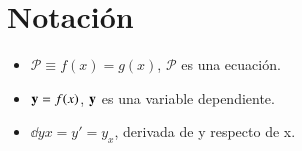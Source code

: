 
\chapter{Notaci\'{o}n}
\begin{multicols}{2}
    \begin{itemize}
        \item $ \mathcal{P} \equiv f(x) = g(x)$, $\mathcal{P}$ es una ecuación.
        \item $\mathbf{y} = f(x)$, $\mathbf{y}$ es una variable dependiente.
        \item $\dd{y}{x} = y' = y_x$, derivada de y respecto de x.
    \end{itemize}
\end{multicols}
